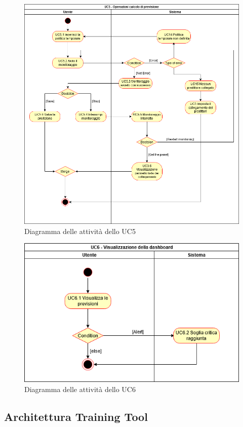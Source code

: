 \begin{figure}[H]
\centering
\includegraphics[scale=0.5]{../../Diagrams/Activity_diagrams/uc5.png}
\caption{Diagramma delle attività dello UC5}
\end{figure}
\begin{figure}[H]
\centering
\includegraphics[scale=0.6]{../../Diagrams/Activity_diagrams/uc6.png}
\caption{Diagramma delle attività dello UC6}
\end{figure}

\subsection{Architettura Training Tool}

